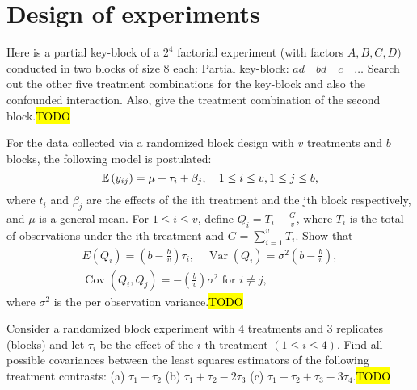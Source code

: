 
\chapter{Design of experiments\label{chap:designOfExperiments}}
\begin{example}
\label{exa:isi2004samplepsb5}Here is a partial key-block of a $2^{4}$
factorial experiment (with factors $A,B,C,D)$ conducted in two blocks
of size 8 each: Partial key-block: $ad\quad bd\quad c\quad\ldots$
Search out the other five treatment combinations for the key-block
and also the confounded interaction. Also, give the treatment combination
of the second block.\hl{TODO}
\end{example}

\begin{example}
\label{exa:isi2006samplepsb10}For the data collected via a randomized
block design with $v$ treatments and $b$ blocks, the following model
is postulated: 
\[
\mathbb{E}\left(y_{ij}\right)=\mu+\tau_{i}+\beta_{j},\quad1\leq i\leq v,1\leq j\leq b,
\]
 where $t_{i}$ and $\beta_{j}$ are the effects of the ith treatment
and the jth block respectively, and $\mu$ is a general mean. For
$1\leq i\leq v$, define $Q_{i}=T_{i}-\frac{G}{v}$, where $T_{i}$
is the total of observations under the ith treatment and $G=\sum_{i=1}^{v}T_{i}$.
Show that 
\[
\begin{array}{r}
E\left(Q_{i}\right)=\left(b-\frac{b}{v}\right)\tau_{i},\quad\operatorname{Var}\left(Q_{i}\right)=\sigma^{2}\left(b-\frac{b}{v}\right),\\
\operatorname{Cov}\left(Q_{i},Q_{j}\right)=-\left(\frac{b}{v}\right)\sigma^{2}\text{ for }i\neq j,
\end{array}
\]
 where $\sigma^{2}$ is the per observation variance.\hl{TODO}
\end{example}

\begin{example}
\label{exa:isi2008samplepsb12}Consider a randomized block experiment
with 4 treatments and 3 replicates (blocks) and let $\tau_{i}$ be
the effect of the $i$ th treatment $(1\leq i\leq4)$. Find all possible
covariances between the least squares estimators of the following
treatment contrasts: (a) $\tau_{1}-\tau_{2}$ (b) $\tau_{1}+\tau_{2}-2\tau_{3}$
(c) $\tau_{1}+\tau_{2}+\tau_{3}-3\tau_{4}$.\hl{TODO}
\end{example}


